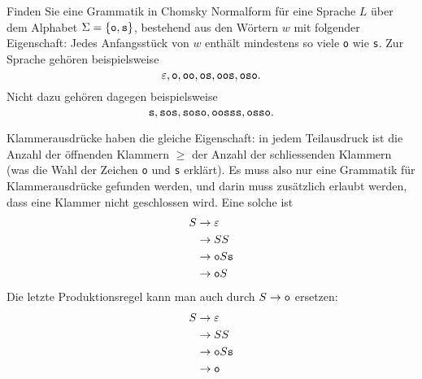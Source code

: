 Finden Sie eine Grammatik in Chomsky Normalform für eine Sprache
$L$ über dem Alphabet
$\Sigma=\{\text{\tt o},\text{\tt s}\}$, bestehend aus den Wörtern
$w$ mit folgender Eigenschaft: Jedes Anfangsstück von $w$ enthält mindestens
so viele {\tt o} wie {\tt s}. Zur Sprache gehören beispielsweise
\[
\varepsilon,
\text{\tt o},
\text{\tt oo},
\text{\tt os},
\text{\tt oos},
\text{\tt oso}.
\]
Nicht dazu gehören dagegen beispielsweise
\[
\text{\tt s},
\text{\tt sos},
\text{\tt soso},
\text{\tt oosss},
\text{\tt osso}.
\]


\begin{loesung}
Klammerausdrücke haben die gleiche Eigenschaft: in jedem Teilausdruck
ist die Anzahl der öffnenden Klammern $\ge$ der Anzahl der schliessenden
Klammern (was die Wahl der Zeichen {\tt o} und {\tt s} erklärt). Es muss
also nur eine Grammatik für Klammerausdrücke gefunden werden, und darin
muss zusätzlich erlaubt werden, dass eine Klammer nicht geschlossen
wird. Eine solche ist
\begin{align*}
S&\rightarrow \varepsilon\\
 &\rightarrow SS\\
 &\rightarrow {\tt o}S{\tt s}\\
 &\rightarrow {\tt o}S
\end{align*}
Die letzte Produktionsregel kann man auch durch $S\rightarrow{\tt o}$
ersetzen:
\begin{align*}
S&\rightarrow \varepsilon\\
 &\rightarrow SS\\
 &\rightarrow {\tt o}S{\tt s}\\
 &\rightarrow {\tt o}
\end{align*}


\end{loesung}
